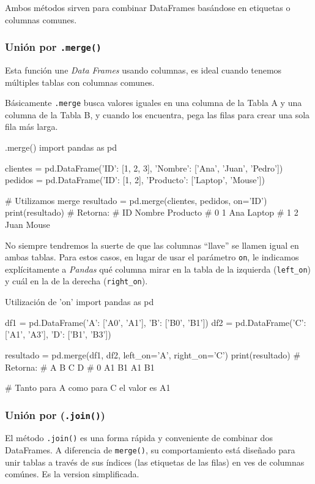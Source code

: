 Ambos métodos sirven para combinar DataFrames basándose en etiquetas o columnas comunes.

\subsubsection{Unión por \texttt{.merge()}}

Esta función une \textit{Data Frames} usando columnas, es ideal cuando tenemos múltiples tablas con columnas comunes. 

Básicamente \texttt{.merge} busca valores iguales en una columna de la Tabla A y una columna de la Tabla B, y cuando los encuentra, pega las filas para crear una sola fila más larga.

\begin{pycode}{.merge()}
import pandas as pd

clientes = pd.DataFrame({'ID': [1, 2, 3], 'Nombre': ['Ana', 'Juan', 'Pedro']})
pedidos = pd.DataFrame({'ID': [1, 2], 'Producto': ['Laptop', 'Mouse']})

# Utilizamos merge
resultado = pd.merge(clientes, pedidos, on='ID')
print(resultado) # Retorna: 
#    ID  Nombre  Producto 
# 0    1    Ana    Laptop 
# 1    2   Juan     Mouse 
\end{pycode}

No siempre tendremos la suerte de que las columnas ``llave'' se llamen igual en ambas tablas. Para estos casos, en lugar de usar el parámetro \texttt{on}, le indicamos explícitamente a \textit{Pandas} qué columna mirar en la tabla de la izquierda (\texttt{left\_on}) y cuál en la de la derecha (\texttt{right\_on}).

\begin{pycode}{Utilización de 'on'}
import pandas as pd

df1 = pd.DataFrame({'A': ['A0', 'A1'], 'B': ['B0', 'B1']})
df2 = pd.DataFrame({'C': ['A1', 'A3'], 'D': ['B1', 'B3']})

resultado = pd.merge(df1, df2, left_on='A', right_on='C')
print(resultado) # Retorna:
#     A   B   C   D
# 0  A1  B1  A1  B1

# Tanto para A como para C el valor es A1    
\end{pycode}




\subsubsection{Unión por (\texttt{.join()})}

El método \texttt{.join()} es una forma rápida y conveniente de combinar dos DataFrames. A diferencia de \texttt{merge()}, su comportamiento está diseñado para unir tablas a través de sus índices (las etiquetas de las filas) en ves de columnas comúnes. Es la version simplificada.

